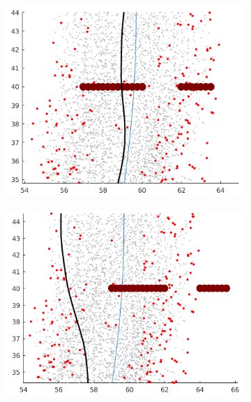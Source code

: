 \begin{figure}[h]
	\begin{subfigure}{.24\textwidth}
	\includegraphics[width=\textwidth]{figures/dyn_prog_dis_1_low.png}
	\end{subfigure}
	\begin{subfigure}{.24\textwidth}
	\includegraphics[width=\textwidth]{figures/dyn_prog_dis_2_low.png}
	\end{subfigure}
	\begin{subfigure}{.24\textwidth}

\end{subfigure}
\end{figure}
